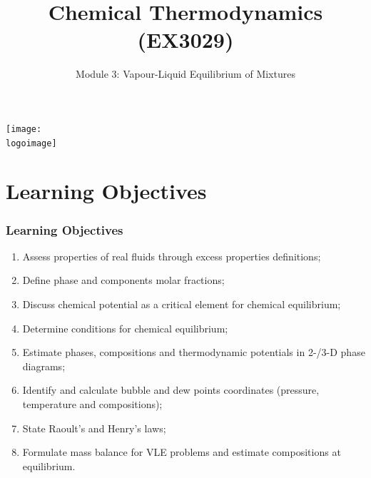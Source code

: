 \documentclass[10pt,compress,handout,ignorenonframetext,unknownkeysallowed]{beamer}
\institute{School of Engineering}
\title{Chemical Thermodynamics (EX3029)}
\subtitle{Module 3: Vapour-Liquid Equilibrium of Mixtures}
\date[ ]{ }
\newcommand{\logoimage}{../../FigBanner/UoAHorizBanner}
\begin{document}
\begin{frame}
  \titlepage
  \vfill%
  \begin{center}
    \texttt{[image: \\logoimage]}
  \end{center}
\end{frame}





\section{Learning Objectives}

\begin{frame}
 \frametitle{Learning Objectives}
   \begin{enumerate}
     \item<1-> Assess properties of real fluids through excess properties definitions; 
     \item<1-> Define phase and components molar fractions;
     \item<1-> Discuss chemical potential as a critical element for chemical equilibrium;
     \item<1-> Determine conditions for chemical equilibrium;
     \item<1-> Estimate phases, compositions and thermodynamic potentials in 2-/3-D phase diagrams;
     \item<1-> Identify and calculate bubble and dew points coordinates (\ie pressure, temperature and compositions);
     \item<1-> State Raoult's and Henry's laws;
     \item<1-> Formulate mass balance for VLE problems and estimate compositions at equilibrium.
   \end{enumerate}

\end{frame}

\end{document}
